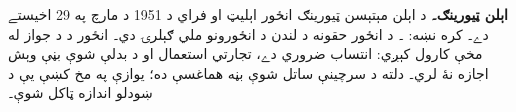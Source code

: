 \textbf{اېلن ټيورينګ۔} د اېلن مېتېسن ټيورينګ انځور اېليټ او فراي د 1951 د مارچ په 29 اخيستے دے۔ کره نښه: ۔ د انځور حقونه د لندن د انځورونو ملي ګېلرۍ دي۔ انځور د \href{http://creativecommons.org/licenses/by-nc-nd/3.0/}{} د جواز له مخې کارول کېږي: انتساب ضروري دے، تجارتي استعمال او د بدلې شوې بڼې وېش اجازه نۀ لري۔ دلته د سرچينې ساتل شوې بڼه هماغسې ده؛ يوازې په مخ کښې يې د ښودلو اندازه ټاکل شوې۔
